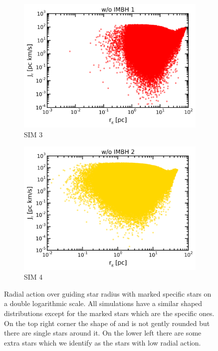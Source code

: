 \begin{figure}[htbp]
\begin{subfigure}{0.475\textwidth}
		\includegraphics[width=\textwidth]{Plots/r_g_J_r_noIMBH1.png}
		\caption{SIM 3}
		\label{fig:r_g_J_r_noIMBH1}
	\end{subfigure}
	\hfill
	\begin{subfigure}{0.475\textwidth}
		\centering
		\includegraphics[width=\textwidth]{Plots/r_g_J_r_noIMBH2.png}
		\caption{SIM 4}
		\label{fig:r_g_J_r_noIMBH2}
	\end{subfigure}
	\caption{Radial action over guiding star radius with marked specific stars on a double logarithmic scale. All simulations have a similar shaped distributions except for the marked stars which are the specific ones. On the top right corner the shape of  and  is not gently rounded but there are single stars around it. On the lower left there are some extra stars which we identify as the stars with low radial action.}
	\label{fig:r_g_J_r}
\end{figure}
